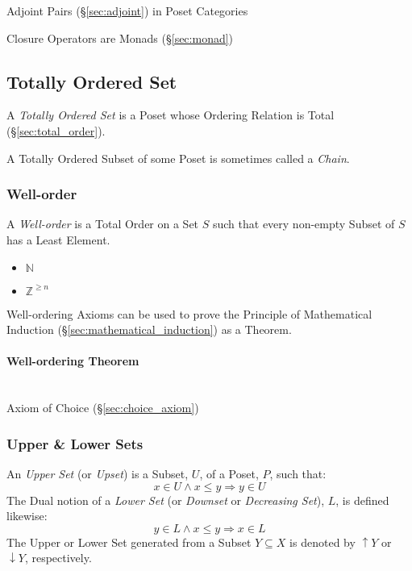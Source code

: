 Adjoint Pairs (\S\ref{sec:adjoint}) in Poset Categories

Closure Operators are Monads (\S\ref{sec:monad})



\subsection{Totally Ordered Set}\label{sec:totally_ordered}

A \emph{Totally Ordered Set} is a Poset whose Ordering Relation is
Total (\S\ref{sec:total_order}).

A Totally Ordered Subset of some Poset is sometimes called a
\emph{Chain}.




\subsubsection{Well-order}\label{sec:well_order}

A \emph{Well-order} is a Total Order on a Set $S$ such that every
non-empty Subset of $S$ has a Least Element.

\begin{itemize}
  \item $\mathbb{N}$
  \item $\mathbb{Z}^{\geq n}$
\end{itemize}

Well-ordering Axioms can be used to prove the Principle of
Mathematical Induction (\S\ref{sec:mathematical_induction}) as a
Theorem.


\paragraph{Well-ordering Theorem}\label{sec:wellorder_theorem}
\hfill \\

Axiom of Choice (\S\ref{sec:choice_axiom})



\subsubsection{Upper \& Lower Sets}\label{sec:upper_lower}

An \emph{Upper Set} (or \emph{Upset}) is a Subset, $U$, of a Poset,
$P$, such that:
\[
  x \in U \wedge x \leq y \Rightarrow y \in U
\]
The Dual notion of a \emph{Lower Set} (or \emph{Downset} or
\emph{Decreasing Set}), $L$, is defined likewise:
\[
  y \in L \wedge x \leq y \Rightarrow x \in L
\]
The Upper or Lower Set generated from a Subset $Y \subseteq X$ is
denoted by $\uparrow Y$ or $\downarrow Y$, respectively.

